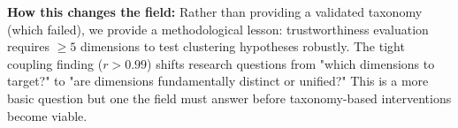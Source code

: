 \textbf{How this changes the field:} Rather than providing a validated taxonomy (which failed), we provide a methodological lesson: trustworthiness evaluation requires $\geq 5$ dimensions to test clustering hypotheses robustly. The tight coupling finding ($r > 0.99$) shifts research questions from "which dimensions to target?" to "are dimensions fundamentally distinct or unified?" This is a more basic question but one the field must answer before taxonomy-based interventions become viable.
